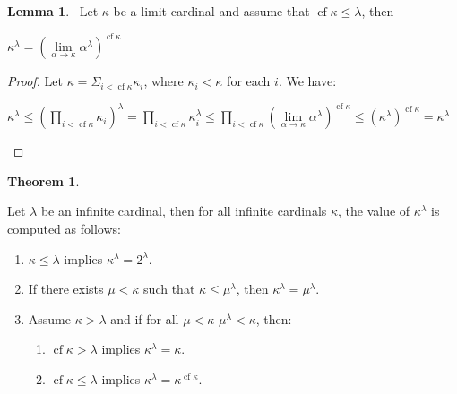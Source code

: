 \documentclass[8pt]{article}
\theoremstyle{definition}
\theoremstyle{definition}
\newtheorem{theorem}{Theorem}[section]
\theoremstyle{definition}
\theoremstyle{definition}
\theoremstyle{definition}
\theoremstyle{definition}
\theoremstyle{definition}
\theoremstyle{definition}
\newtheorem{lemma}{Lemma}[section]
\theoremstyle{definition}
\theoremstyle{definition}
\theoremstyle{definition}
\theoremstyle{definition}
\theoremstyle{definition}
\theoremstyle{definition}
\theoremstyle{question}
\begin{document}
\begin{lemma}~\label{limitcard:lim}
  Let $\kappa$ be a limit cardinal and assume that $\operatorname{cf} \kappa \leq \lambda$, then
  \begin{center}
    $\kappa^{\lambda} = (\lim \limits_{\alpha \to \kappa} \alpha^{\lambda})^{\operatorname{cf} \kappa}$
  \end{center}
\end{lemma}
\begin{proof}
  Let $\kappa = \Sigma_{i < \operatorname{cf} \kappa} \kappa_i$, where $\kappa_i < \kappa$ for each $i$.
  We have:
  \begin{center}
    $\kappa^{\lambda} \leq (\prod \limits_{i < \operatorname{cf} \kappa} \kappa_i)^{\lambda} = 
    \prod \limits_{i < \operatorname{cf} \kappa} \kappa_i^{\lambda} \leq 
    \prod \limits_{i < \operatorname{cf} \kappa} (\lim \limits_{\alpha \to \kappa} \alpha^{\lambda})^{\operatorname{cf} \kappa} \leq (\kappa^{\lambda})^{\operatorname{cf} \kappa} = \kappa^{\lambda}$
  \end{center}
\end{proof}

\begin{theorem}~\label{cardexp}

  Let $\lambda$ be an infinite cardinal, then for all infinite cardinals $\kappa$, 
  the value of $\kappa^{\lambda}$ is computed as follows:

  \begin{enumerate}
    \item $\kappa \leq \lambda$ implies $\kappa^{\lambda} = 2^{\lambda}$.
    \item If there exists $\mu < \kappa$ such that $\kappa \leq \mu^{\lambda}$,
    then $\kappa^{\lambda} = \mu^{\lambda}$.
    \item Assume $\kappa > \lambda$ and if for all $\mu < \kappa$ $\mu^{\lambda} < \kappa$, then:
    \begin{enumerate}
      \item $\operatorname{cf} \kappa > \lambda$ implies $\kappa^{\lambda} = \kappa$.
      \item $\operatorname{cf} \kappa \leq \lambda$ implies $\kappa^{\lambda} = \kappa^{\operatorname{cf} \kappa}$.
    \end{enumerate}
  \end{enumerate}
\end{theorem}
\end{document}
